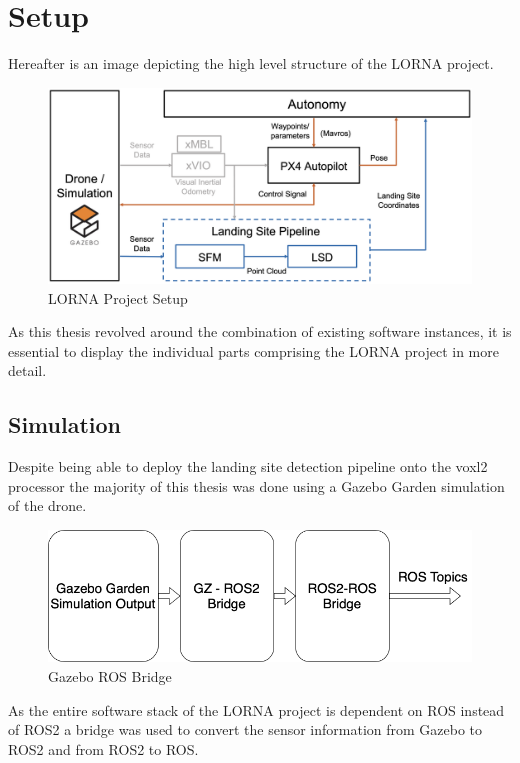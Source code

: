 \chapter{Setup}

Hereafter is an image depicting the high level structure of the LORNA project.

\begin{figure}[ht]
    \includegraphics[scale=0.18]{images/setup/setup_flowchart.png}
    \caption{LORNA Project Setup}
    \label{fig:lorna_setup}
\end{figure}

As this thesis revolved around the combination of existing software instances, it is essential to display the individual parts comprising the LORNA project in more detail.

\clearpage %
\section{Simulation}

Despite being able to deploy the landing site detection pipeline onto the voxl2 processor the majority of this thesis was done using a Gazebo Garden simulation of the drone. 

\begin{figure}[ht!]
    \includegraphics[scale=0.45]{images/setup/GZ_flowchart.png}
    \caption{Gazebo ROS Bridge}
\end{figure}


As the entire software stack of the LORNA project is dependent on ROS instead of ROS2 a bridge was used to convert the sensor information from Gazebo to ROS2 and from ROS2 to ROS.


